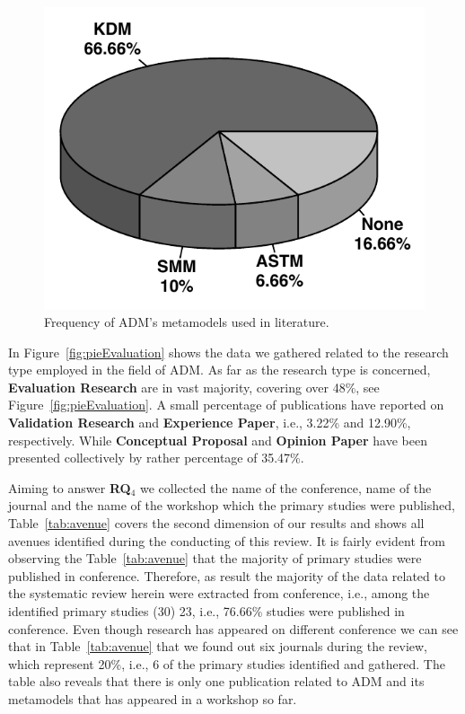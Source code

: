  \begin{figure}[!h]
 \centering
   \includegraphics[scale=0.55]{figuras/pieChartModel}
 \caption{Frequency of ADM's metamodels used in literature.}
 \label{fig:pie}
\end{figure} 


In Figure~\ref{fig:pieEvaluation} shows the data we gathered related to the research type employed in the field of ADM. As far as the research type is concerned, \textbf{Evaluation Research} are in vast majority, covering over 48\%, see Figure~\ref{fig:pieEvaluation}. A small percentage of publications have reported on \textbf{Validation Research} and \textbf{Experience Paper}, i.e., 3.22\% and 12.90\%, respectively. While \textbf{Conceptual Proposal}
 and \textbf{Opinion Paper} have been presented collectively by rather percentage of 35.47\%.

 Aiming to answer \textbf{RQ$_4$} we collected the name of the conference, name of the journal and the name of the workshop which the primary studies were published, Table~\ref{tab:avenue} covers the second dimension of our results and shows all avenues identified during the conducting of this review. It is fairly evident from observing the Table~\ref{tab:avenue} that the majority of primary studies were published in conference. Therefore, as result the majority of the data related to the systematic review herein were extracted from conference, i.e., among the identified primary studies (30) 23, i.e., 76.66\% studies were published in conference. Even though research has appeared on different conference we can see that in Table~\ref{tab:avenue} that we found out six journals during the review, which represent 20\%, i.e., 6 of the primary studies identified and gathered. The table also reveals that there is only one publication related to ADM and its metamodels that has appeared in a workshop so far.



